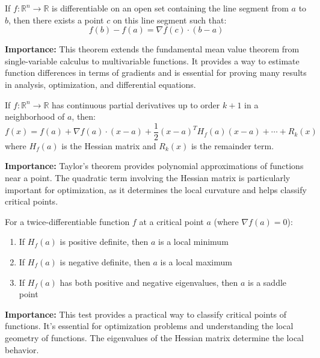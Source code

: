 \begin{definition}
If $f: \mathbb{R}^n \to \mathbb{R}$ is differentiable on an open set containing the line segment from $a$ to $b$, then there exists a point $c$ on this line segment such that:
\[f(b) - f(a) = \nabla f(c) \cdot (b - a)\]
\end{definition}

\noindent\textbf{Importance:} This theorem extends the fundamental mean value theorem from single-variable calculus to multivariable functions. It provides a way to estimate function differences in terms of gradients and is essential for proving many results in analysis, optimization, and differential equations.



\begin{definition}
If $f: \mathbb{R}^n \to \mathbb{R}$ has continuous partial derivatives up to order $k+1$ in a neighborhood of $a$, then:
\[f(x) = f(a) + \nabla f(a) \cdot (x-a) + \frac{1}{2}(x-a)^T H_f(a)(x-a) + \cdots + R_k(x)\]
where $H_f(a)$ is the Hessian matrix and $R_k(x)$ is the remainder term.
\end{definition}

\noindent\textbf{Importance:} Taylor's theorem provides polynomial approximations of functions near a point. The quadratic term involving the Hessian matrix is particularly important for optimization, as it determines the local curvature and helps classify critical points.



\begin{theorem}
For a twice-differentiable function $f$ at a critical point $a$ (where $\nabla f(a) = 0$):
\begin{enumerate}[label=(\alph*)]
\item If $H_f(a)$ is positive definite, then $a$ is a local minimum
\item If $H_f(a)$ is negative definite, then $a$ is a local maximum
\item If $H_f(a)$ has both positive and negative eigenvalues, then $a$ is a saddle point
\end{enumerate}
\end{theorem}

\noindent\textbf{Importance:} This test provides a practical way to classify critical points of functions. It's essential for optimization problems and understanding the local geometry of functions. The eigenvalues of the Hessian matrix determine the local behavior.



